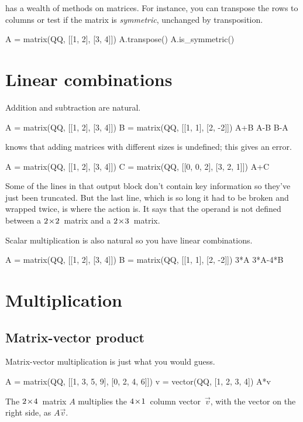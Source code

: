 \Sage{} has a wealth of methods on matrices.
For instance, you can transpose the rows to columns or test if the 
matrix is \textit{symmetric},
unchanged by transposition.
\begin{sageoutput}
A = matrix(QQ, [[1, 2], [3, 4]])
A.transpose()
A.is_symmetric()
\end{sageoutput}




\section{Linear combinations}
Addition and subtraction are natural.
\begin{sageoutput}
A = matrix(QQ, [[1, 2], [3, 4]])
B = matrix(QQ, [[1, 1], [2, -2]])
A+B
A-B
B-A
\end{sageoutput}

\Sage{} knows that adding matrices with different sizes is undefined; 
this gives an error. 
\begin{sageoutput}[s,3,70,-66;s,4,70,-66;s,8,70,-66;s,10,70,-66;s,12,124,14;s,12,70,13]
A = matrix(QQ, [[1, 2], [3, 4]])
C = matrix(QQ, [[0, 0, 2], [3, 2, 1]])
A+C
\end{sageoutput}
\noindent
Some of the lines in that output block don't contain key information so 
they've just been truncated.
But the last line, which is so long it had to be broken and wrapped 
twice, is where the action is.
It says that the \inlinecode{+} operand is not defined between a
$2 \! \times \! 2$~matrix and a $2 \! \times \! 3$~matrix.

Scalar multiplication is also natural
so you have linear combinations.
\begin{sageoutput}[d,0,2]
A = matrix(QQ, [[1, 2], [3, 4]])
B = matrix(QQ, [[1, 1], [2, -2]])
3*A
3*A-4*B
\end{sageoutput}



\section{Multiplication}

\subsection{Matrix-vector product}
Matrix-vector multiplication is just what you would guess.
\begin{sageoutput}
A = matrix(QQ, [[1, 3, 5, 9], [0, 2, 4, 6]])
v = vector(QQ, [1, 2, 3, 4])
A*v
\end{sageoutput}
\noindent
The $2 \! \times \! 4$~matrix $A$ multiplies the 
$4 \! \times \! 1$~column vector~$\vec{v}$, with the vector on the right side,
as $A\vec{v}$.

